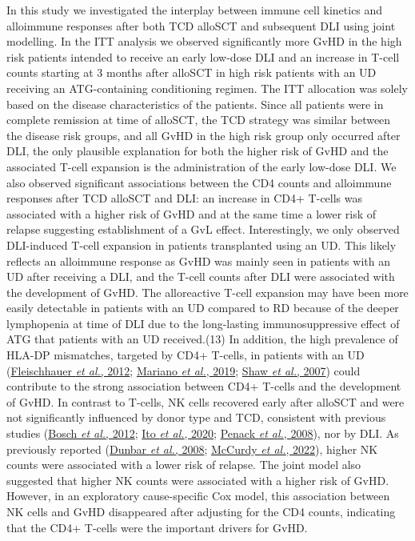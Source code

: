 \documentclass[
  letterpaper,
  DIV=11,
  numbers=noendperiod]{scrreprt}
\begin{document}
In this study we investigated the interplay between immune cell kinetics
and alloimmune responses after both TCD alloSCT and subsequent DLI using
joint modelling. In the ITT analysis we observed significantly more GvHD
in the high risk patients intended to receive an early low-dose DLI and
an increase in T-cell counts starting at 3 months after alloSCT in high
risk patients with an UD receiving an ATG-containing conditioning
regimen. The ITT allocation was solely based on the disease
characteristics of the patients. Since all patients were in complete
remission at time of alloSCT, the TCD strategy was similar between the
disease risk groups, and all GvHD in the high risk group only occurred
after DLI, the only plausible explanation for both the higher risk of
GvHD and the associated T-cell expansion is the administration of the
early low-dose DLI. We also observed significant associations between
the CD4 counts and alloimmune responses after TCD alloSCT and DLI: an
increase in CD4+ T-cells was associated with a higher risk of GvHD and
at the same time a lower risk of relapse suggesting establishment of a
GvL effect. Interestingly, we only observed DLI-induced T-cell expansion
in patients transplanted using an UD. This likely reflects an alloimmune
response as GvHD was mainly seen in patients with an UD after receiving
a DLI, and the T-cell counts after DLI were associated with the
development of GvHD. The alloreactive T-cell expansion may have been
more easily detectable in patients with an UD compared to RD because of
the deeper lymphopenia at time of DLI due to the long-lasting
immunosuppressive effect of ATG that patients with an UD received.(13)
In addition, the high prevalence of HLA-DP mismatches, targeted by CD4+
T-cells, in patients with an UD
(\protect\hyperlink{ref-fleischhauerEffectTcellepitopeMatching2012}{Fleischhauer
\emph{et al.}, 2012};
\protect\hyperlink{ref-marianoAssessmentExtendedCoverageNextGeneration2019}{Mariano
\emph{et al.}, 2019};
\protect\hyperlink{ref-shawImportanceHLADPB1Unrelated2007}{Shaw \emph{et
al.}, 2007}) could contribute to the strong association between CD4+
T-cells and the development of GvHD. In contrast to T-cells, NK cells
recovered early after alloSCT and were not significantly influenced by
donor type and TCD, consistent with previous studies
(\protect\hyperlink{ref-boschImmuneReconstitutionAntithymocyte2012a}{Bosch
\emph{et al.}, 2012};
\protect\hyperlink{ref-itoImpactLowdoseAntithymocyte2020}{Ito \emph{et
al.}, 2020};
\protect\hyperlink{ref-penackSerotherapyThymoglobulinAlemtuzumab2008}{Penack
\emph{et al.}, 2008}), nor by DLI. As previously reported
(\protect\hyperlink{ref-dunbarRelationshipCirculatingNatural2008}{Dunbar
\emph{et al.}, 2008};
\protect\hyperlink{ref-mccurdySignaturesGVHDRelapse2022}{McCurdy
\emph{et al.}, 2022}), higher NK counts were associated with a lower
risk of relapse. The joint model also suggested that higher NK counts
were associated with a higher risk of GvHD. However, in an exploratory
cause-specific Cox model, this association between NK cells and GvHD
disappeared after adjusting for the CD4 counts, indicating that the CD4+
T-cells were the important drivers for GvHD.
\end{document}
